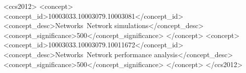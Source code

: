 
\begin{CCSXML}
	<ccs2012>
	<concept>
		<concept_id>10003033.10003079.10003081</concept_id>
		<concept_desc>Networks~Network simulations</concept_desc>
		<concept_significance>500</concept_significance>
	</concept>
	<concept>
		<concept_id>10003033.10003079.10011672</concept_id>
		<concept_desc>Networks~Network performance analysis</concept_desc>
		<concept_significance>500</concept_significance>
	</concept>
	</ccs2012>
\end{CCSXML}


